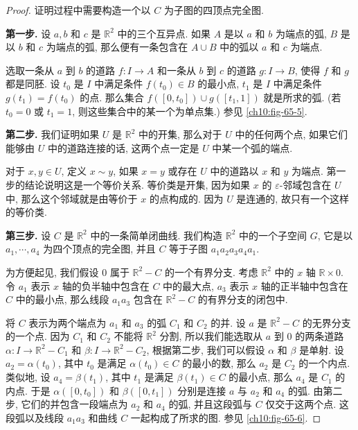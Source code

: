 \begin{proof}
证明过程中需要构造一个以 $C$ 为子图的四顶点完全图.

\textbf{第一步.} 设 $a,b$ 和 $c$ 是 $\mathbb{R}^{2}$ 中的三个互异点. 如果 $A$ 是以 $a$ 和 $b$ 为端点的弧, $B$ 是以 $b$ 和 $c$ 为端点的弧, 那么便有一条包含在 $A\cup B$ 中的弧以 $a$ 和 $c$ 为端点.

选取一条从 $a$ 到 $b$ 的道路 $f\colon I\to A$ 和一条从 $b$ 到 $c$ 的道路 $g\colon I\to B$, 使得 $f$ 和 $g$ 都是同胚. 设 $t_{0}$ 是 $I$ 中满足条件 $f(t_{0})\in B$ 的最小点, $t_{1}$ 是 $I$ 中满足条件 $g(t_{1})=f(t_{0})$ 的点. 那么集合 $f([0,t_{0}])\cup g([t_{1},1])$ 就是所求的弧. (若 $t_{0}=0$ 或 $t_{1}=1$, 则这些集合中的某一个为单点集.) 参见 \cref{ch10:fig-65-5}.

\textbf{第二步.} 我们证明如果 $U$ 是 $\mathbb{R}^{2}$ 中的开集, 那么对于 $U$ 中的任何两个点, 如果它们能够由 $U$ 中的道路连接的话, 这两个点一定是 $U$ 中某一个弧的端点.

对于 $x,y\in U$, 定义 $x\sim y$, 如果 $x=y$ 或存在 $U$ 中的道路以 $x$ 和 $y$ 为端点. 第一步的结论说明这是一个等价关系. 等价类是开集, 因为如果 $x$ 的 $\varepsilon$-邻域包含在 $U$ 中, 那么这个邻域就是由等价于 $x$ 的点构成的. 因为 $U$ 是连通的, 故只有一个这样的等价类.

\textbf{第三步.} 设 $C$ 是 $\mathbb{R}^{2}$ 中的一条简单闭曲线. 我们构造 $\mathbb{R}^{2}$ 中的一个子空间 $G$, 它是以 $a_{1},\cdots,a_{4}$ 为四个顶点的完全图, 并且 $C$ 等于子图 $a_{1}a_{2}a_{3}a_{4}a_{1}$.

为方便起见, 我们假设 $0$ 属于 $\mathbb{R}^{2}-C$ 的一个有界分支. 考虑 $\mathbb{R}^{2}$ 中的 $x$ 轴 $\mathbb{R}\times 0$. 令 $a_{1}$ 表示 $x$ 轴的负半轴中包含在 $C$ 中的最大点, $a_{3}$ 表示 $x$ 轴的正半轴中包含在 $C$ 中的最小点, 那么线段 $a_{1}a_{3}$ 包含在 $\mathbb{R}^{2}-C$ 的有界分支的闭包中.

将 $C$ 表示为两个端点为 $a_{1}$ 和 $a_{3}$ 的弧 $C_{1}$ 和 $C_{2}$ 的并. 设 $a$ 是 $\mathbb{R}^{2}-C$ 的无界分支的一个点. 因为 $C_{1}$ 和 $C_{2}$ 不能将 $\mathbb{R}^{2}$ 分割, 所以我们能选取从 $a$ 到 $0$ 的两条道路 $\alpha\colon I\to\mathbb{R}^{2}-C_{1}$ 和 $\beta\colon I\to\mathbb{R}^{2}-C_{2}$, 根据第二步, 我们可以假设 $\alpha$ 和 $\beta$ 是单射. 设 $a_{2}=\alpha(t_{0})$, 其中 $t_{0}$ 是满足 $\alpha(t_{0})\in C$ 的最小的数, 那么 $a_{2}$ 是 $C_{2}$ 的一个内点. 类似地, 设 $a_{4}=\beta(t_{1})$, 其中 $t_{1}$ 是满足 $\beta(t_{1})\in C$ 的最小点, 那么 $a_{4}$ 是 $C_{1}$ 的内点. 于是 $\alpha([0,t_{0}])$ 和 $\beta([0,t_{1}])$ 分别是连接 $a$ 与 $a_{2}$ 和 $a_{4}$ 的弧. 由第二步, 它们的并包含一段端点为 $a_{2}$ 和 $a_{4}$ 的弧, 并且这段弧与 $C$ 仅交于这两个点. 这段弧以及线段 $a_{1}a_{3}$ 和曲线 $C$ 一起构成了所求的图. 参见 \cref{ch10:fig-65-6}.


\end{proof}
